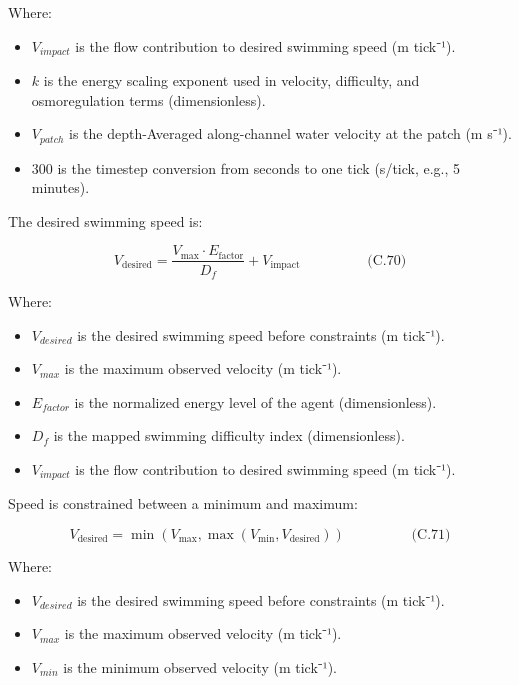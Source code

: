 \documentclass[
]{book}
\providecommand{\tightlist}{%
  \setlength{\itemsep}{0pt}\setlength{\parskip}{0pt}}
\begin{document}
Where:

\begin{itemize}
\tightlist
\item
  \(V_{impact}\) is the flow contribution to desired swimming speed (m
  tick⁻¹).
\item
  \(k\) is the energy scaling exponent used in velocity, difficulty, and
  osmoregulation terms (dimensionless).
\item
  \(V_{patch}\) is the depth-Averaged along-channel water velocity at
  the patch (m s⁻¹).
\item
  \(300\) is the timestep conversion from seconds to one tick (s/tick,
  e.g., 5 minutes).
\end{itemize}

The desired swimming speed is:

\[ \begin{equation} V_{\text{desired}} = \frac{V_{\max} \cdot E_{\text{factor}}}{D_f} + V_{\text{impact}}  \hspace{2cm} \text{(C.70)} \end{equation} \]

Where:

\begin{itemize}
\tightlist
\item
  \(V_{desired}\) is the desired swimming speed before constraints (m
  tick⁻¹).
\item
  \(V_{max}\) is the maximum observed velocity (m tick⁻¹).
\item
  \(E_{factor}\) is the normalized energy level of the agent
  (dimensionless).
\item
  \(D_f\) is the mapped swimming difficulty index (dimensionless).
\item
  \(V_{impact}\) is the flow contribution to desired swimming speed (m
  tick⁻¹).
\end{itemize}

Speed is constrained between a minimum and maximum:

\[ \begin{equation} V_{\text{desired}}  = \min(V_{\max}, \max(V_{\min}, V_{\text{desired}}))  \hspace{2cm} \text{(C.71)} \end{equation} \]

Where:

\begin{itemize}
\tightlist
\item
  \(V_{desired}\) is the desired swimming speed before constraints (m
  tick⁻¹).
\item
  \(V_{max}\) is the maximum observed velocity (m tick⁻¹).
\item
  \(V_{min}\) is the minimum observed velocity (m tick⁻¹).
\end{itemize}
\end{document}
